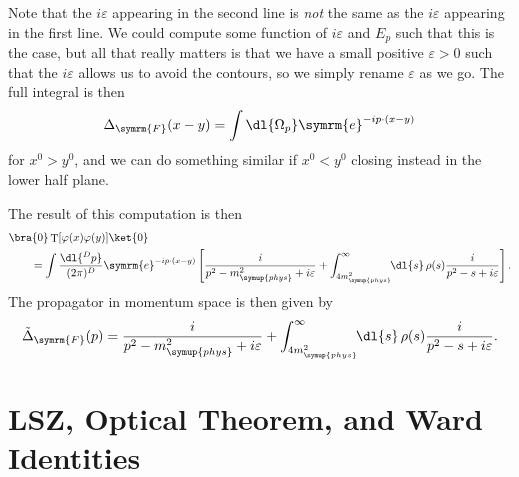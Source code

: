 \documentclass[fleqn]{NotesClass}
\newcommand{\e}{\symrm{e}}
\DeclareMathOperator{\timeOrdering}{T}
\newcommand{\feynman}{\symrm{F}}
\newcommand{\phys}{\symup{phys}}
\begin{document}
    Note that the \(i\varepsilon\) appearing in the second line is \emph{not} the same as the \(i\varepsilon\) appearing in the first line.
    We could compute some function of \(i\varepsilon\) and \(E_p\) such that this is the case, but all that really matters is that we have a small positive \(\varepsilon > 0\) such that the \(i\varepsilon\) allows us to avoid the contours, so we simply rename \(\varepsilon\) as we go.
    The full integral is then
    \begin{equation}
        \Delta_{\feynman}(x - y) = \int \dl{\Omega_p} \e^{-ip \cdot (x - y)}
    \end{equation}
    for \(x^0 > y^0\), and we can do something similar if \(x^0 < y^0\) closing instead in the lower half plane.
    
    The result of this computation is then
    \begin{align}
        &\bra{0} \timeOrdering[\varphi(x)\varphi(y)] \ket{0}\\
        &\qquad = \int \frac{\dl{^Dp}}{(2\pi)^D} \e^{-ip\cdot(x - y)} \left[ \frac{i}{p^2 - m_{\phys}^2 + i\varepsilon} + \int_{4m_{\phys}^2}^{\infty} \!\! \dl{s} \, \rho(s) \frac{i}{p^2 - s + i\varepsilon} \right]. \notag
    \end{align}
    The propagator in momentum space is then given by
    \begin{equation}
        \tilde{\Delta}_{\feynman}(p) = \frac{i}{p^2 - m_{\phys}^2 + i\varepsilon} + \int_{4m_{\phys}^2}^{\infty} \!\! \dl{s} \, \rho(s) \frac{i}{p^2 - s + i\varepsilon}.
    \end{equation}
    
    \chapter{LSZ, Optical Theorem, and Ward Identities}
\end{document}
